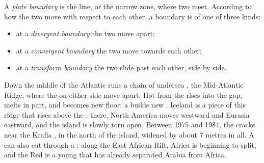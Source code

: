 \begin{definition}\label{def:g7:plate-tectonics:plate-boundary}
A \emph{plate boundary} is the line, or the narrow
zone, where two  meet. According to how the two  move with
respect to each other, a boundary is of one of three kinds:
\begin{itemize}
  \item at a \emph{divergent boundary} the two
         move apart;
  \item at a \emph{convergent boundary} the two
         move towards each other;
  \item at a \emph{transform boundary} the two
         slide past each other, side by side.
\end{itemize}
\end{definition}

\begin{example}\label{ex:g7:plate-tectonics:divergent}
Down the middle of the Atlantic  runs a chain of undersea ,
the Mid-Atlantic Ridge, where the  on either side move apart. Hot
 from the  rises into the gap, melts in part, and becomes new
 floor: a  builds new . Iceland is a piece of
this ridge that rises above the : there, North America moves westward
and Eurasia eastward, and the island is slowly torn open. Between 1975 and
1984, the cracks near the Krafla , in the north of the island,
widened by about 7 metres in all. A  can also cut through
a : along the East African Rift, Africa is beginning to split,
and the Red  is a young  that has already separated Arabia from
Africa.
\end{example}

